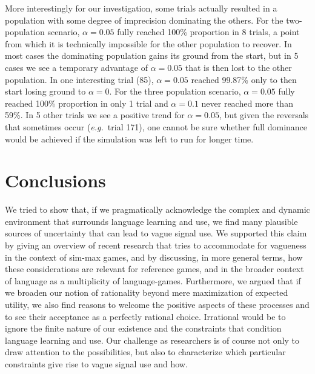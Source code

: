 \documentclass[a4paper]{article}
\begin{document}
More interestingly for our investigation, some trials actually resulted in a population with some degree of imprecision dominating the others.
For the two-population scenario, $\alpha = 0.05$ fully reached 100\% proportion in 8 trials, a point from which it is technically impossible for the other population to recover.
In most cases the dominating population gains its ground from the start, but in 5 cases we see a temporary advantage of $\alpha = 0.05$ that is then lost to the other population.
In one interesting trial (85), $\alpha = 0.05$ reached 99.87\% only to then start losing ground to $\alpha = 0$.
For the three population scenario, $\alpha = 0.05$ fully reached 100\% proportion in only 1 trial and $\alpha = 0.1$ never reached more than 59\%.
In 5 other trials we see a positive trend for $\alpha = 0.05$, but given the reversals that sometimes occur (\emph{e.g.}~trial 171), one cannot be sure whether full dominance would be achieved if the simulation was left to run for longer time.



\section{Conclusions}
\label{sec:conclusions}
We tried to show that, if we pragmatically acknowledge the complex and dynamic environment that surrounds language learning and use, we find many plausible sources of uncertainty that can lead to vague signal use.
We supported this claim by giving an overview of recent research that tries to accommodate for vagueness in the context of sim-max games, and by discussing, in more general terms, how these considerations are relevant for reference games, and in the broader context of language as a multiplicity of language-games.
Furthermore, we argued that if we broaden our notion of rationality beyond mere maximization of expected utility, we also find reasons to welcome the positive aspects of these processes and to see their acceptance as a perfectly rational choice.
Irrational would be to ignore the finite nature of our existence and the constraints that condition language learning and use.
Our challenge as researchers is of course not only to draw attention to the possibilities, but also to characterize which particular constraints give rise to vague signal use and how.
\end{document}
